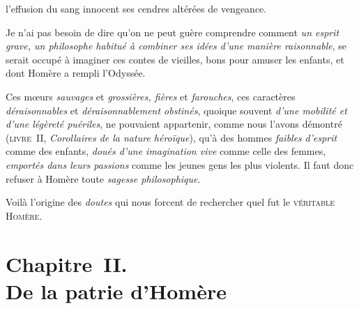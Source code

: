 \documentclass[french,twoside]{book} %
\newcommand\chapteropen{} %
\newcommand\chapterclose{} %
\begin{document}
l’effusion du sang innocent ses cendres altérées de vengeance.\par
Je n’ai pas besoin de dire qu’on ne peut guère comprendre comment {\itshape un esprit grave, un philosophe habitué à combiner ses idées d’une manière raisonnable}, se serait occupé à imaginer ces contes de vieilles, bons pour amuser les enfants, et dont Homère a rempli l’Odyssée.\par
Ces mœurs {\itshape sauvages} et {\itshape grossières, fières} et {\itshape farouches}, ces caractères {\itshape déraisonnables} et {\itshape déraisonnablement obstinés}, quoique souvent {\itshape d’une mobilité et d’une légèreté puériles}, ne pouvaient appartenir, comme nous l’avons démontré ({\scshape livre} II, {\itshape Corollaires de la nature héroïque}), qu’à des hommes {\itshape faibles}  {\itshape d’esprit} comme des enfants, {\itshape doués d’une imagination vive} comme celle des femmes, {\itshape emportés dans leurs passions} comme les jeunes gens les plus violents. Il faut donc refuser à Homère toute {\itshape sagesse philosophique}.\par
Voilà l’origine des {\itshape doutes} qui nous forcent de rechercher quel fut le {\scshape véritable Homère}.
\chapterclose


\chapteropen
\chapter[{Chapitre II. De la patrie d’Homère}]{Chapitre II. \\
De la patrie d’Homère}
\end{document}
